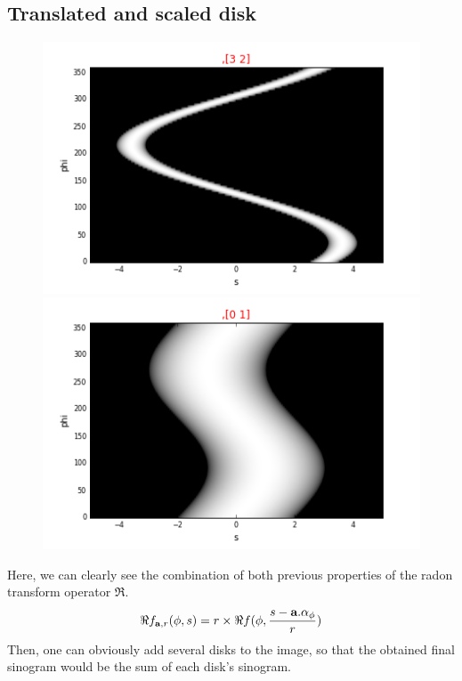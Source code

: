 \documentclass[a4,12pt]{article}
\begin{document}
\subsection{Translated and scaled disk}
\begin{figure}[h!]
   \begin{minipage}[c]{.46\linewidth}
      \includegraphics[scale=0.5]{../images/sinograms/translatedAndScaledDisk.png} 
   \end{minipage} \hfill
   \begin{minipage}[c]{.46\linewidth}
      \includegraphics[scale=0.5]{../images/sinograms/translatedAndScaledDisk1.png} 
   \end{minipage}
\end{figure}
Here, we can clearly see the combination of both previous properties of the radon transform operator $\Re$. \\
\[
\Re f_{\textbf{a},r}(\phi,s) = r\times\Re f(\phi,\frac{s-\textbf{a}.\alpha_{\phi}}{r}) \\
\]
Then, one can obviously add several disks to the image, so that the obtained final sinogram would be the sum of each disk's sinogram.
\end{document}
